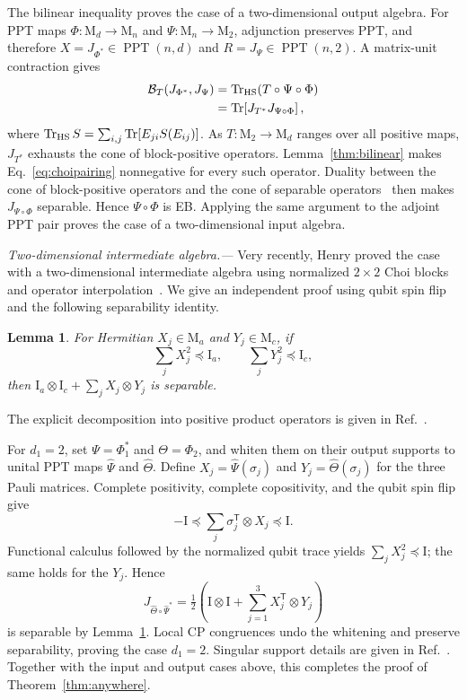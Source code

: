 \documentclass[aps,prl,reprint,superscriptaddress,nofootinbib]{revtex4-2}
\newcommand{\M}{\mathrm{M}}
\newcommand{\I}{\mathrm{I}}
\newcommand{\Tr}{\operatorname{Tr}}
\newcommand{\PPT}{\operatorname{PPT}}
\newcommand{\cB}{\mathcal B}
\newtheorem{lemma}[theorem]{Lemma}
\begin{document}
The bilinear inequality proves the case of a two-dimensional output algebra.
For PPT maps
$\Phi:\M_d\to\M_n$ and $\Psi:\M_n\to\M_2$,
adjunction preserves PPT, and therefore $X=J_{\Phi^*}\in\PPT(n,d)$ and
$R=J_\Psi\in\PPT(n,2)$.  A matrix-unit contraction gives
\begin{align}
 \cB_T(J_{\Phi^*},J_\Psi)
 &=\Tr_{\rm HS}(T\circ\Psi\circ\Phi)
\nonumber\\
 &=\Tr\!\left[J_{T^*}J_{\Psi\circ\Phi}\right],
\label{eq:choipairing}
\end{align}
where $\Tr_{\rm HS}S=\sum_{i,j}\Tr[E_{ji}S(E_{ij})]$.  As
$T:\M_2\to\M_d$ ranges over all positive maps, $J_{T^*}$ exhausts the
cone of block-positive operators.  Lemma~\ref{thm:bilinear} makes
Eq.~\eqref{eq:choipairing} nonnegative for every such operator.  Duality
between the cone of block-positive operators and the cone of separable
operators~\cite{Horodecki1996} then makes
$J_{\Psi\circ\Phi}$ separable.  Hence $\Psi\circ\Phi$ is EB.  Applying the
same argument to the adjoint PPT pair proves the case of a two-dimensional
input algebra.

\textit{Two-dimensional intermediate algebra.---}
Very recently, Henry proved the case with a two-dimensional intermediate
algebra using normalized $2\times2$ Choi blocks and operator
interpolation~\cite{Henry2026}.  We give an independent proof using qubit spin
flip and the following separability identity.

\begin{lemma}
\label{lem:rowgram}
For Hermitian $X_j\in\M_a$ and $Y_j\in\M_c$, if
\begin{equation}
 \sum_jX_j^2\preceq\I_a,\qquad
 \sum_jY_j^2\preceq\I_c,
\label{eq:rowbounds}
\end{equation}
then $\I_a\otimes\I_c+\sum_jX_j\otimes Y_j$ is separable.
\end{lemma}

The explicit decomposition into positive product operators is given
in Ref.~\cite{Supplement}.

For $d_1=2$, set $\Psi=\Phi_1^*$ and
$\Theta=\Phi_2$, and whiten them on their output supports to unital PPT maps
$\widehat\Psi$ and $\widehat\Theta$.  Define
$X_j=\widehat\Psi(\sigma_j)$ and
$Y_j=\widehat\Theta(\sigma_j)$ for the three Pauli matrices.  Complete
positivity, complete copositivity, and the qubit
spin flip give
\begin{equation}
 -\I\preceq\sum_j\sigma_j^{\mathsf T}\otimes X_j\preceq\I.
\label{eq:spinflip}
\end{equation}
Functional calculus followed by the normalized qubit trace yields
$\sum_jX_j^2\preceq\I$; the same holds for the $Y_j$.  Hence
\begin{equation}
 J_{\widehat\Theta\circ\widehat\Psi^*}
 =\tfrac12\left(\I\otimes\I+
   \sum_{j=1}^3X_j^{\mathsf T}\otimes Y_j\right)
\label{eq:middlechoi}
\end{equation}
is separable by Lemma~\ref{lem:rowgram}.  Local CP congruences undo the
whitening and preserve separability, proving the case $d_1=2$.  Singular
support details are given in Ref.~\cite{Supplement}.  Together with the input
and output cases above, this completes the proof of
Theorem~\ref{thm:anywhere}.
\end{document}

